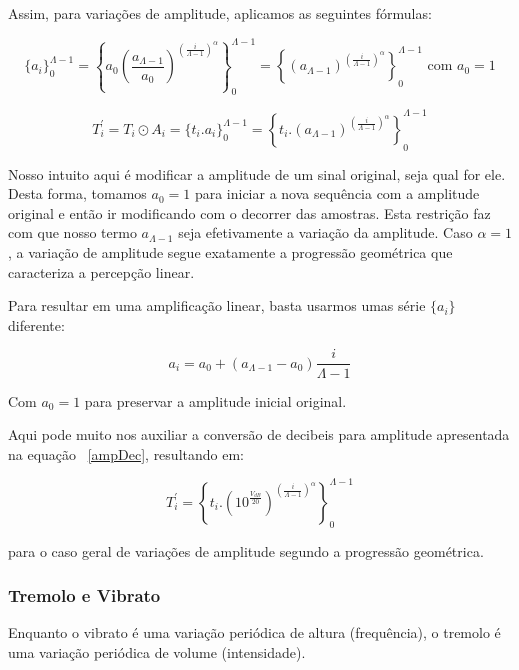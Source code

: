 Assim, para variações de amplitude, aplicamos as seguintes fórmulas:

\begin{equation}
\{a_i\}_0^{\Lambda-1}=\left \{ a_0 \left ( \frac{a_{\Lambda-1}}{a_0} \right )^{\left ( \frac{i}{\Lambda-1} \right )^\alpha} \right \}_0^{\Lambda-1}=\left \{ \left ( {a_{\Lambda-1}} \right )^{\left ( \frac{i}{\Lambda-1} \right )^\alpha} \right \}_0^{\Lambda-1} \text{ com } a_0=1
\end{equation}

\begin{equation}
T_i^{'}=T_i \odot A_i = \{t_i . a_i\}_0^{\Lambda-1}=\left \{ t_i . (a_{\Lambda-1} )^{\left ( \frac{i}{\Lambda-1} \right )^\alpha} \right \}_0^{\Lambda-1}
\end{equation}

Nosso intuito aqui é modificar a amplitude de um sinal original, seja qual for ele. Desta forma, tomamos
$a_0=1$ para iniciar a nova sequência com a amplitude original e então ir modificando com o decorrer das amostras.
Esta restrição faz com que nosso termo $a_{\Lambda-1}$ seja efetivamente a variação da amplitude.
Caso $\alpha=1$, a variação de amplitude segue exatamente a progressão geométrica que caracteriza
a percepção linear.

Para resultar em uma amplificação linear, basta usarmos umas série $\{a_i\}$ diferente:

\begin{equation}
a_i=a_0 + (a_{\Lambda-1}-a_0)\frac{i}{\Lambda-1}
\end{equation}

Com $a_0=1$ para preservar a amplitude inicial original.

Aqui pode muito nos auxiliar a conversão de decibeis para amplitude apresentada na equação ~\ref{ampDec},
resultando em:

\begin{equation}
T_i^{'}=\left \{ t_i . (10^{\frac{V_{dB}}{20}} )^{\left ( \frac{i}{\Lambda-1} \right )^\alpha} \right \}_0^{\Lambda-1}
\end{equation}

para o caso geral de variações de amplitude segundo a progressão geométrica.


\subsubsection{Tremolo e Vibrato}

Enquanto o vibrato é uma variação periódica de altura (frequência),
o tremolo é uma variação periódica de volume (intensidade).

